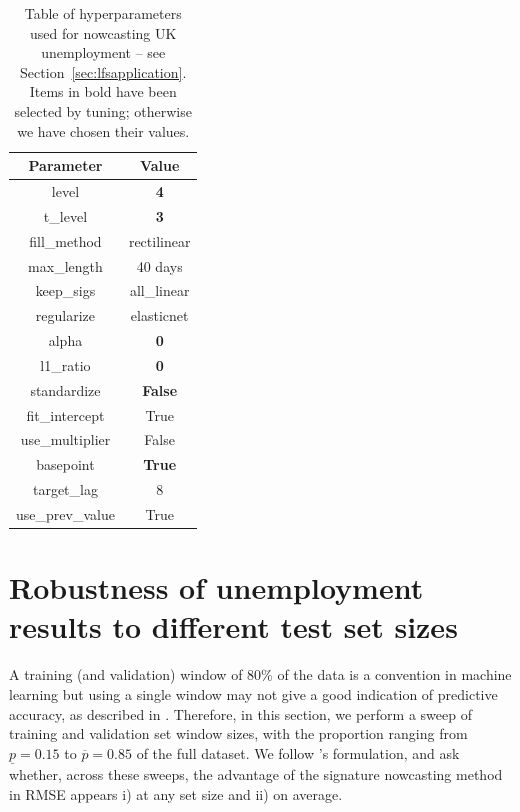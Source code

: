 \documentclass[a4paper, 12pt]{article}
\theoremstyle{remark}
\begin{document}
\begin{table}[h]
    \caption{Table of hyperparameters used for nowcasting UK unemployment -- see Section~\ref{sec:lfsapplication}. Items in bold have been selected by tuning; otherwise we have chosen their values.}
    \centering
    \begin{tabular}{c c}
         Parameter & Value \\
         \hline
         \hline
        level & \textbf{4} \\
        t\_level & \textbf{3} \\
        fill\_method & rectilinear \\
        max\_length & 40 days \\
        keep\_sigs & all\_linear \\
        regularize & elasticnet \\
        alpha & \textbf{0} \\
        l1\_ratio & \textbf{0} \\
        standardize & \textbf{False} \\
        fit\_intercept & True \\
        use\_multiplier &  False \\
        basepoint & \textbf{True} \\
        target\_lag & 8 \\
        use\_prev\_value & True
        
    \end{tabular}

    \label{tab:params_lfs}
\end{table}

\section{Robustness of unemployment results to different test set sizes}
\label{sec:lfsrobustness}

A training (and validation) window of 80\% of the data is a convention in machine learning but using a single window may not give a good indication of predictive accuracy, as described in \citet{rossi_outofsample_2012}. Therefore, in this section, we perform a sweep of training and validation set window sizes, with the proportion ranging from $\underline{p}=0.15$ to $\overline{p}=0.85$ of the full dataset. We follow \citet{rossi_outofsample_2012}'s formulation, and ask whether, across these sweeps, the advantage of the signature nowcasting method in RMSE appears i) at any set size and ii) on average.
\end{document}
